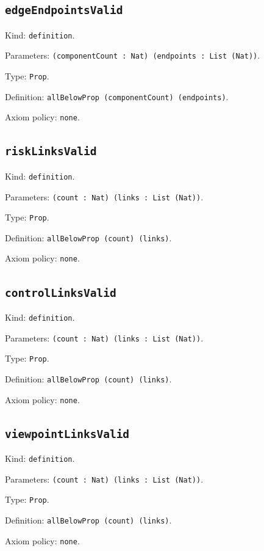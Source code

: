\documentclass[11pt]{article}
\begin{document}
\subsection*{\texttt{edgeEndpointsValid}}
\noindent Kind: \texttt{definition}.\par
\noindent Parameters: \texttt{(componentCount : Nat) (endpoints : List (Nat))}.\par
\noindent Type: \texttt{Prop}.\par
\noindent Definition: \texttt{allBelowProp (componentCount) (endpoints)}.\par
\noindent Axiom policy: \texttt{none}.\par
\subsection*{\texttt{riskLinksValid}}
\noindent Kind: \texttt{definition}.\par
\noindent Parameters: \texttt{(count : Nat) (links : List (Nat))}.\par
\noindent Type: \texttt{Prop}.\par
\noindent Definition: \texttt{allBelowProp (count) (links)}.\par
\noindent Axiom policy: \texttt{none}.\par
\subsection*{\texttt{controlLinksValid}}
\noindent Kind: \texttt{definition}.\par
\noindent Parameters: \texttt{(count : Nat) (links : List (Nat))}.\par
\noindent Type: \texttt{Prop}.\par
\noindent Definition: \texttt{allBelowProp (count) (links)}.\par
\noindent Axiom policy: \texttt{none}.\par
\subsection*{\texttt{viewpointLinksValid}}
\noindent Kind: \texttt{definition}.\par
\noindent Parameters: \texttt{(count : Nat) (links : List (Nat))}.\par
\noindent Type: \texttt{Prop}.\par
\noindent Definition: \texttt{allBelowProp (count) (links)}.\par
\noindent Axiom policy: \texttt{none}.\par
\end{document}
